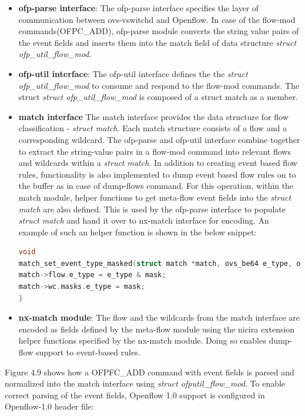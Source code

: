 \begin{itemize}
\item \textbf{ofp-parse interface}: The ofp-parse interface specifies the layer of communication between ovs-vswitchd and Openflow. In case of the flow-mod commands(OFPC_ADD), ofp-parse module converts the string value pairs of the event fields and inserts them into the match field of data structure \textit{struct ofp_util_flow_mod}.
\item \textbf{ofp-util interface}: The ofp-util interface defines the the \textit{struct ofp_util_flow_mod} to consume and respond to the flow-mod commands. The struct \textit{struct ofp_util_flow_mod} is composed of a struct match as a member. 
\item \textbf{match interface} The match interface provides the data structure for flow classification - \textit{struct match}. Each match structure consists of a flow and a corresponding wildcard.  The ofp-parse and ofp-util interface combine together to extract the string-value pairs in a flow-mod command into relevant flows and wildcards within a \textit{struct match}. 
In addition to creating event based flow rules, functionality is also implemented to dump event based flow rules on to the buffer as in case of dump-flows command. For this operation, within the match module, helper functions to get meta-flow event fields into the \textit{struct match} are also defined. This is used by the ofp-parse interface to populate \textit{struct match} and hand it over to nx-match interface for encoding. An example of such an helper function is shown in the below snippet: \newline
\begin{lstlisting}[language=c]
void
match_set_event_type_masked(struct match *match, ovs_be64 e_type, ovs_be64 mask){
match->flow.e_type = e_type & mask;
match->wc.masks.e_type = mask;
}
\end{lstlisting}

\item \textbf{nx-match module}: The flow and the wildcards from the match interface are encoded as fields defined by the meta-flow module using the nicira extension helper functions specified by the nx-match module. Doing so enables dump-flow support to event-based rules.
\end{itemize}

Figure 4.9 shows how a OFPFC_ADD command with event fields is parsed and normalized into the match interface using \textit{struct ofputil_flow_mod}. To enable correct parsing of the event fields, Openflow 1.0 support is configured in Openflow-1.0 header file: \newline

